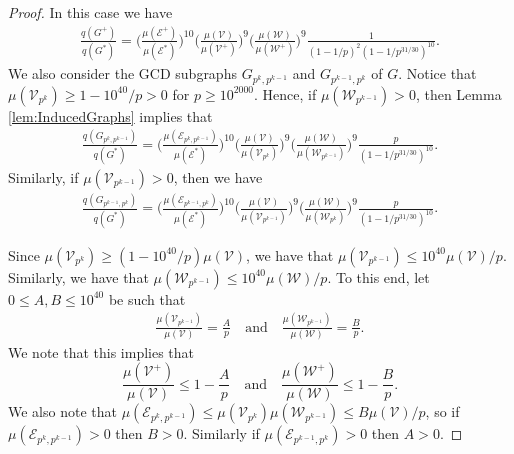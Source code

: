 \documentclass[12pt]{amsart}
\numberwithin{equation}{section}
\theoremstyle{definition}
\theoremstyle{remark}
\newcommand{\CE}{\mathcal{E}}
\newcommand{\CV}{\mathcal{V}}
\newcommand{\CW}{\mathcal{W}}
\newcommand{\al}[1]{\begin{align} #1 \end{align} }
\renewcommand{\le}{\leqslant}
\renewcommand{\ge}{\geqslant}
\begin{document}
\begin{proof}
\medskip

 In this case we have
\al{
\frac{q(G^+)}{q(G^*)} =
	\bigg(\frac{\mu(\CE^+)}{\mu(\CE^*)}\bigg)^{10} 
	\bigg( \frac{\mu(\CV)}{\mu(\CV^+)}\bigg)^{9}
	 \bigg( \frac{\mu(\CW)}{\mu(\CW^+)}\bigg)^{9}
		\frac{1}{(1-1/p)^2(1-1/p^{31/30})^{10}} .
\label{eq:G+}
}
We also consider the GCD subgraphs  $G_{p^k,p^{k-1}}$ and $G_{p^{k-1},p^k}$ of $G$. Notice that $\mu(\CV_{p^k})\ge1-10^{40}/p>0$ for $p\ge 10^{2000}$. Hence, if $\mu(\CW_{p^{k-1}})>0$, then Lemma \ref{lem:InducedGraphs} implies that
\al{
\frac{q(G_{p^k,p^{k-1}})}{q(G^*)} =
	\bigg(\frac{\mu(\CE_{p^k,p^{k-1}})}{\mu(\CE^*)}\bigg)^{10} 
	\bigg( \frac{\mu(\CV)}{\mu(\CV_{p^k})}\bigg)^{9}
	 \bigg( \frac{\mu(\CW)}{\mu(\CW_{p^{k-1}})}\bigg)^{9}
		\frac{p}{(1-1/p^{31/30})^{10}} .
\label{eq:G2}
}
Similarly, if $\mu(\CV_{p^{k-1}})>0$, then we have 
\al{
\frac{q(G_{p^{k-1},p^k})}{q(G^*)} =
	\bigg(\frac{\mu(\CE_{p^{k-1},p^k})}{\mu(\CE^*)}\bigg)^{10} 
	\bigg( \frac{\mu(\CV)}{\mu(\CV_{p^{k-1}})}\bigg)^{9}
	 \bigg( \frac{\mu(\CW)}{\mu(\CW_{p^k})}\bigg)^{9}
		\frac{p}{(1-1/p^{31/30})^{10}} .
\label{eq:G3}
}

Since $\mu(\CV_{p^k})\ge(1-10^{40}/p)\mu(\CV)$, we have that $\mu(\CV_{p^{k-1}})\le 10^{40}\mu(\CV)/p$. Similarly, we have that $\mu(\CW_{p^{k-1}})\le 10^{40}\mu(\CW)/p$. To this end, let $0\le A,B\le 10^{40}$ be such that
\al{
\frac{\mu(\CV_{p^{k-1}})}{\mu(\CV)} = \frac{A}{p} 
\quad\text{and}\quad
\frac{\mu(\CW_{p^{k-1}})}{\mu(\CW)} = \frac{B}{p}.
\label{eq:AB}
}
We note that this implies that
\[
\frac{\mu(\CV^+)}{\mu(\CV)}\le 1-\frac{A}{p}\quad\text{and}\quad\frac{\mu(\CW^+)}{\mu(\CW)} \le  1-\frac{B}{p}.
\]
We also note that $\mu(\CE_{p^k,p^{k-1}})\le \mu(\CV_{p^k})\mu(\CW_{p^{k-1}})\le B\mu(\CV)/p$, so if $\mu(\CE_{p^k,p^{k-1}})>0$ then $B>0$. Similarly if $\mu(\CE_{p^{k-1},p^{k}})>0$ then $A>0$.




\end{proof}
\end{document}
